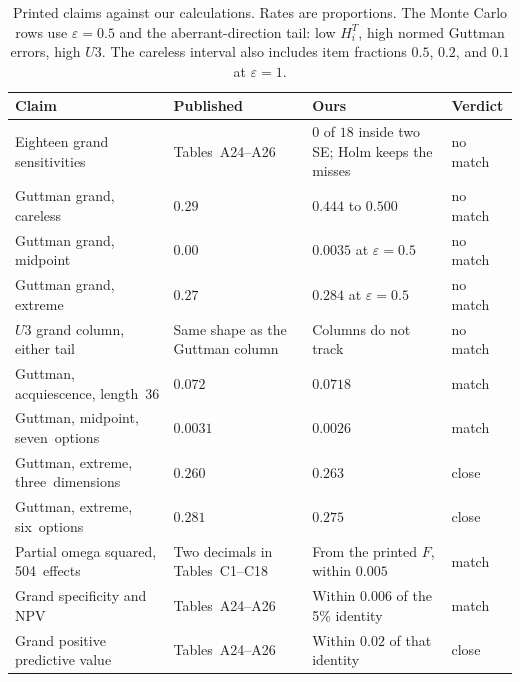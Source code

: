 \documentclass[11pt]{article}
\begin{document}
\begin{table}[H]
\centering
\small
\begin{tabular}{@{}>{\raggedright\arraybackslash}p{}>{\raggedright\arraybackslash}p{}>{\raggedright\arraybackslash}p{}>{\raggedright\arraybackslash}p{}@{}}
\toprule
Claim & Published & Ours & Verdict \\
\midrule
Eighteen grand sensitivities &
Tables~A24--A26 &
\(0\) of \(18\) inside two SE; Holm keeps the misses &
no match \\
Guttman grand, careless &
\(0.29\) &
\(0.444\) to \(0.500\) &
no match \\
Guttman grand, midpoint &
\(0.00\) &
\(0.0035\) at \(\varepsilon=0.5\) &
no match \\
Guttman grand, extreme &
\(0.27\) &
\(0.284\) at \(\varepsilon=0.5\) &
no match \\
\(U3\) grand column, either tail &
Same shape as the Guttman column &
Columns do not track &
no match \\
Guttman, acquiescence, length~36 &
\(0.072\) &
\(0.0718\) &
match \\
Guttman, midpoint, seven~options &
\(0.0031\) &
\(0.0026\) &
match \\
Guttman, extreme, three~dimensions &
\(0.260\) &
\(0.263\) &
close \\
Guttman, extreme, six~options &
\(0.281\) &
\(0.275\) &
close \\
Partial omega squared, 504~effects &
Two decimals in Tables~C1--C18 &
From the printed \(F\), within \(0.005\) &
match \\
Grand specificity and NPV &
Tables~A24--A26 &
Within \(0.006\) of the 5\% identity &
match \\
Grand positive predictive value &
Tables~A24--A26 &
Within \(0.02\) of that identity &
close \\
\bottomrule
\end{tabular}
\caption{Printed claims against our calculations. Rates are proportions.
The Monte Carlo rows use \(\varepsilon=0.5\) and the aberrant-direction
tail: low \(H_i^T\), high normed Guttman errors, high \(U3\).
The careless interval also includes item fractions \(0.5\), \(0.2\), and
\(0.1\) at \(\varepsilon=1\).}
\label{tab:compare}
\end{table}
\end{document}
